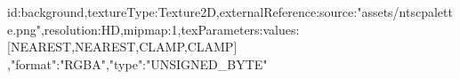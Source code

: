 {id:background,textureType:Texture2D,externalReference:{source:"assets/ntscpalette.png"},resolution:HD,mipmap:1,texParameters:{values:[NEAREST,NEAREST,CLAMP,CLAMP]}
,"format":"RGBA","type":"UNSIGNED_BYTE"}

